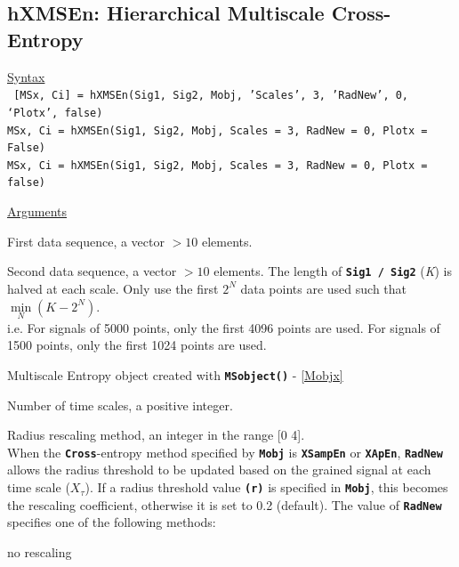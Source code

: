 \documentclass[12pt, a4paper, titlepage, openany]{book}
\begin{document}
\subsection{\normalsize hXMSEn: \hspace{15mm} Hierarchical Multiscale Cross-Entropy}
\noindent\ul{Syntax} \vspace{6mm} \\ \noindent \texttt{\footnotesize
[MSx, Ci] = hXMSEn(Sig1, Sig2, Mobj, 'Scales', 3, 'RadNew', 0, ‘Plotx’, false)\\
MSx, Ci = hXMSEn(Sig1, Sig2, Mobj, Scales = 3, RadNew = 0, Plotx = False)\\ 
MSx, Ci = hXMSEn(Sig1, Sig2, Mobj, Scales = 3, RadNew = 0, Plotx = false)}

\noindent \ul{Arguments}
\begin{description}[labelsep=1cm, labelwidth=2cm, nosep, style=multiline,leftmargin=3cm]\footnotesize
\item[\texttt{Sig1}]		First data sequence, a vector $>10$ elements.
\item[\texttt{Sig2}]		Second data sequence, a vector $>10$ elements.
	The length of \texttt{\textbf{Sig1 / Sig2}} (\emph{K}) is halved at each scale. Only use the first $2^N$ data points are used such that $\underset{N}{\min}(K - 2^N)$.\\
i.e. For signals of 5000 points, only the first 4096 points are used. For signals of 1500 points, only the first 1024 points are used.
\item[\texttt{Mobj}]	Multiscale Entropy object created with \texttt{\textbf{MSobject()}} - \ref{Mobjx}
\item[\texttt{Scales}]		Number of time scales, a positive integer.
\item[\texttt{RadNew}]			Radius rescaling method, an integer in the range [0 4].\\
				 When the \texttt{\textbf{Cross}}-entropy method specified by \texttt{\textbf{Mobj}} is \texttt{\textbf{XSampEn}} or \texttt{\textbf{XApEn}}, \texttt{\textbf{RadNew}} allows the radius threshold to be updated based on the grained signal at each time scale ($X_\tau$). If a radius threshold value \texttt{\textbf{(r)}} is specified in \texttt{\textbf{Mobj}},  this becomes the rescaling coefficient, otherwise it is set to 0.2 (default). The value of \texttt{\textbf{RadNew}} specifies one of the following methods:
	\begin{description}[labelsep=5em, labelwidth=4em, nosep,style=multiline,leftmargin=2cm]
		\item[0]	no rescaling

\end{description}
\end{description}
\end{document}
